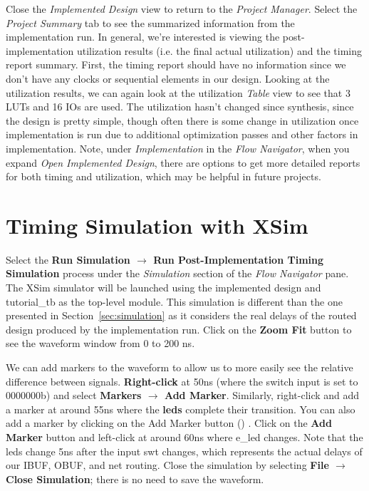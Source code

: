 \documentclass[11pt]{article}
\begin{document}
Close the \textit{Implemented Design} view  to return to the \textit{Project Manager}. Select the \textit{Project Summary} tab to see the summarized information from the implementation run. In general, we're interested is viewing the post-implementation utilization results (i.e. the final actual utilization) and the timing report summary. First, the timing report should have no information since we don't have any clocks or sequential elements in our design. Looking at the utilization results, we can again look at the utilization \textit{Table} view to see that 3 LUTs and 16 IOs are used. The utilization hasn't changed since synthesis, since the design is pretty simple, though often there is some change in utilization once implementation is run due to additional optimization passes and other factors in implementation. Note, under \textit{Implementation} in the \textit{Flow Navigator}, when you expand \textit{Open Implemented Design}, there are options to get more detailed reports for both timing and utilization, which may be helpful in future projects.




\section{Timing Simulation with XSim}
\label{sec:timing_sim}
Select the \textbf{Run Simulation $\rightarrow$ Run Post-Implementation Timing Simulation} process under the \textit{Simulation} section of the \textit{Flow Navigator} pane. The XSim simulator will be launched using the implemented design and tutorial\_tb as the top-level module. This simulation is different than the one presented in Section~\ref{sec:simulation} as it considers the real delays of the routed design produced by the implementation run. Click on the \textbf{Zoom Fit} button to see the waveform window from 0 to 200 ns.

We can add markers to the waveform to allow us to more easily see the relative difference between signals. \textbf{Right-click} at 50ns (where the switch input is set to 0000000b) and select \textbf{Markers $\rightarrow$ Add Marker}. Similarly, right-click and add a marker at around 55ns where the \textbf{leds} complete their transition. You can also add a marker by clicking on the Add Marker button 
()
. Click on the \textbf{Add Marker} button and left-click at around 60ns where e\_led changes. Note that the leds change 5ns after the input swt changes, which represents the actual delays of our IBUF, OBUF, and net routing. Close the simulation by selecting \textbf{File $\rightarrow$ Close Simulation}; there is no need to save the waveform.
\end{document}
